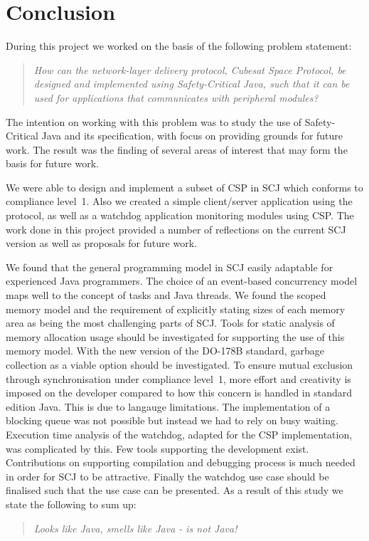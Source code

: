 \chapter{Conclusion}
\label{chapter:Conclusion}
During this project we worked on the basis of the following problem statement:
\begin{quotation}
	\textit{How can the network-layer delivery protocol, Cubesat Space Protocol, be designed and implemented using Safety-Critical Java, such that it can be used for applications that communicates with peripheral modules?}
\end{quotation}
The intention on working with this problem was to study the use of Safety-Critical Java and its specification, with focus on providing grounds for future work. The result was the finding of several areas of interest that may form the basis for future work.

We were able to design and implement a subset of CSP in SCJ which conforms to compliance level~1. Also we created a simple client/server application using the protocol, as well as a watchdog application monitoring modules using CSP. The work done in this project provided a number of reflections on the current SCJ version as well as proposals for future work.

We found that the general programming model in SCJ easily adaptable for experienced Java programmers. The choice of an event-based concurrency model maps well to the concept of tasks and Java threads. We found the scoped memory model and the requirement of explicitly stating sizes of each memory area as being the most challenging parts of SCJ. Tools for static analysis of memory allocation usage should be investigated for supporting the use of this memory model. With the new version of the DO-178B standard, garbage collection as a viable option should be investigated. To ensure mutual exclusion through synchronisation under compliance level~1, more effort and creativity is imposed on the developer compared to how this concern is handled in standard edition Java. This is due to langauge limitations. The implementation of a blocking queue was not possible but instead we had to rely on busy waiting. Execution time analysis of the watchdog, adapted for the CSP implementation, was complicated by this. Few tools supporting the development exist. Contributions on supporting compilation and debugging process is much needed in order for SCJ to be attractive. Finally the watchdog use case should be finalised such that the use case can be presented. As a result of this study we state the following to sum up: 
\begin{quotation}
\centering
	\textit{Looks like Java, smells like Java - is not Java!}
\end{quotation}